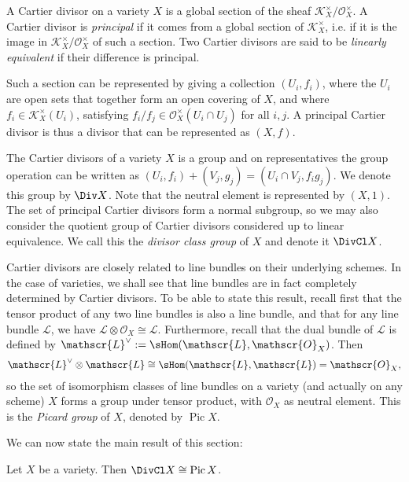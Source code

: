 \documentclass[a4paper,openany]{scrbook}
\DeclareMathOperator{\Pic}{Pic}
\begin{document}
\begin{dfn}
A Cartier divisor on a variety $X$ is a global section of the sheaf $\mathscr{K}_X^\times/\mathscr{O}_X^\times$. A Cartier divisor is \textit{principal} if it comes from a global section of $\mathscr{K}_X^\times$, i.e. if it is the image in $\mathscr{K}_X^\times/\mathscr{O}_X^\times$ of such a section. Two Cartier divisors are said to be \textit{linearly equivalent} if their difference is principal.
\end{dfn}

\begin{remark}
Such a section can be represented by giving a collection $(U_i,f_i)$, where the $U_i$ are open sets that together form an open covering of $X$, and where $f_i\in\mathscr{K}_X^\times(U_i)$, satisfying $f_i/f_j\in\mathscr{O}_X^\times(U_i\cap U_j)$ for all $i,j$. A principal Cartier divisor is thus a divisor that can be represented as $(X,f)$.
\end{remark}

The Cartier divisors of a variety $X$ is a group and on representatives the group operation can be written as $(U_i,f_i)+(V_j,g_j)=(U_i\cap V_j,f_ig_j)$. We denote this group by $\Div X$. Note that the neutral element is represented by $(X,1)$. The set of principal Cartier divisors form a normal subgroup, so we may also consider the quotient group of Cartier divisors considered up to linear equivalence. We call this the \textit{divisor class group} of $X$ and denote it $\DivCl X$.

Cartier divisors are closely related to line bundles on their underlying schemes. In the case of varieties, we shall see that line bundles are in fact completely determined by Cartier divisors. To be able to state this result, recall first that the tensor product of any two line bundles is also a line bundle, and that for any line bundle $\mathscr{L}$, we have $\mathscr{L}\otimes\mathscr{O}_X\cong\mathscr{L}$. Furthermore, recall that the dual bundle of $\mathscr{L}$ is defined by $\mathscr{L}^\vee:=\sHom(\mathscr{L},\mathscr{O}_X)$. Then
$$\mathscr{L}^\vee\otimes\mathscr{L}\cong\sHom(\mathscr{L},\mathscr{L})=\mathscr{O}_X,$$
so the set of isomorphism classes of line bundles on a variety (and actually on any scheme) $X$ forms a group under tensor product, with $\mathscr{O}_X$ as neutral element. This is the \textit{Picard group} of $X$, denoted by $\Pic X$.

We can now state the main result of this section:

\begin{prop}
Let $X$ be a variety. Then $\DivCl X\cong\Pic X$.
\end{prop}
\end{document}
